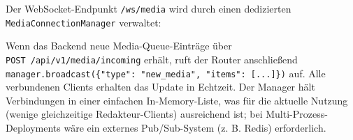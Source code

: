 Der WebSocket-Endpunkt \texttt{/ws/media} wird durch einen dedizierten
\texttt{MediaConnectionManager} verwaltet:

\begin{Shaded}
\begin{Highlighting}[]
     \NormalTok{(}\NormalTok{) }\OperatorTok{{-}\textgreater{}} \NormalTok{:}
        \NormalTok{[WebSocket] }\OperatorTok{=}\NormalTok{ []}

      \NormalTok{(}\OperatorTok{{-}\textgreater{}} \NormalTok{:}

     \NormalTok{) }\OperatorTok{{-}\textgreater{}} \NormalTok{:}
\NormalTok{[WebSocket] }\OperatorTok{=}\NormalTok{ []}
         
            \NormalTok{:}
            \NormalTok{):}
\end{Highlighting}
\end{Shaded}

Wenn das Backend neue Media-Queue-Einträge über
\texttt{POST\ /api/v1/media/incoming} erhält, ruft der Router
anschließend
\texttt{manager.broadcast(\{"type":\ "new\_media",\ "items":\ {[}...{]}\})}
auf. Alle verbundenen Clients erhalten das Update in Echtzeit. Der
Manager hält Verbindungen in einer einfachen In-Memory-Liste, was für
die aktuelle Nutzung (wenige gleichzeitige Redakteur-Clients)
ausreichend ist; bei Multi-Prozess-Deployments wäre ein externes
Pub/Sub-System (z. B. Redis) erforderlich.

